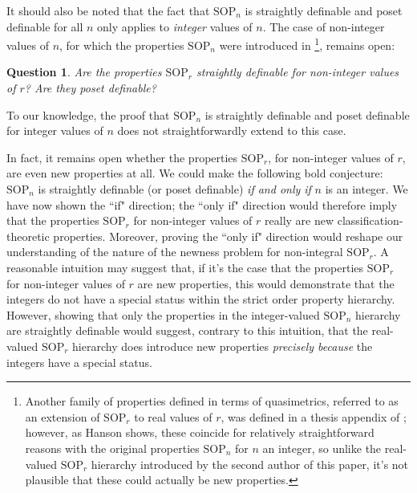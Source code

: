 \documentclass{article}
\newtheorem{question}{Question}
\theoremstyle{definition}
\theoremstyle{definition}
\theoremstyle{definition}
\begin{document}
It should also be noted that the fact that $\mathrm{SOP}_{n}$ is straightly definable and poset definable for all $n$ only applies to \textit{integer} values of $n$. The case of non-integer values of $n$, for which the properties $\mathrm{SOP}_{n}$ were introduced in \cite{mutchnik2025approximations}\footnote{Another family of properties defined in terms of quasimetrics, referred to as an extension of $\mathrm{SOP}_{r}$ to real values of $r$, was defined in a thesis appendix of \cite{hanson2020definability}; however, as Hanson shows, these coincide  for relatively straightforward reasons with the original properties $\mathrm{SOP}_{n}$ for $n$ an integer, so unlike the real-valued $\mathrm{SOP}_{r}$ hierarchy introduced by the second author of this paper, it's not plausible that these could actually be new properties.}, remains open: 

\begin{question}
    Are the properties $\mathrm{SOP}_{r}$ straightly definable for non-integer values of $r$? Are they poset definable?
\end{question}


To our knowledge, the proof that $\mathrm{SOP}_{n}$ is straightly definable and poset definable for integer values of $n$ does not straightforwardly extend to this case.

In fact, it remains open whether the properties $\mathrm{SOP}_{r}$, for non-integer values of $r$, are even new properties at all. We could make the following bold conjecture: $\mathrm{SOP}_{n}$ is straightly definable (or poset definable) \textit{if and only if} $n$ is an integer. We have now shown the ``if" direction; the ``only if" direction would therefore imply that the properties $\mathrm{SOP}_{r}$ for non-integer values of $r$ really are new classification-theoretic properties. Moreover, proving the ``only if" direction would reshape our understanding of the nature of the newness problem for non-integral $\mathrm{SOP}_{r}$. A reasonable intuition may suggest that, if it's the case that the properties $\mathrm{SOP}_{r}$ for non-integer values of $r$ are new properties, this would demonstrate that the integers do not have a special status within the strict order property hierarchy. However, showing that only the properties in the integer-valued $\mathrm{SOP}_{n}$ hierarchy are straightly definable would suggest, contrary to this intuition, that the real-valued $\mathrm{SOP}_{r}$ hierarchy does introduce new properties \textit{precisely because} the integers have a special status.
\end{document}
